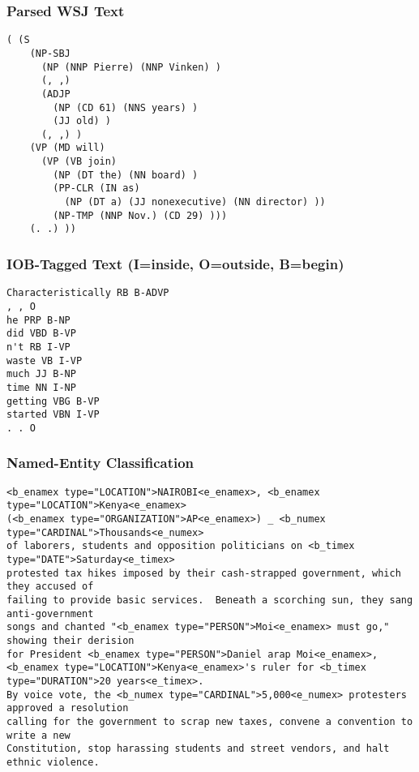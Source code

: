 \documentclass{beamer}             %
\begin{document}
\begin{frame}[fragile]
  \frametitle{Parsed WSJ Text}
{\scriptsize\begin{verbatim}
( (S
    (NP-SBJ
      (NP (NNP Pierre) (NNP Vinken) )
      (, ,)
      (ADJP
        (NP (CD 61) (NNS years) )
        (JJ old) )
      (, ,) )
    (VP (MD will)
      (VP (VB join)
        (NP (DT the) (NN board) )
        (PP-CLR (IN as)
          (NP (DT a) (JJ nonexecutive) (NN director) ))
        (NP-TMP (NNP Nov.) (CD 29) )))
    (. .) ))
\end{verbatim}}
\end{frame}

\begin{frame}[fragile]
  \frametitle{IOB-Tagged Text (I=inside, O=outside, B=begin)}
{\scriptsize\begin{verbatim}
Characteristically RB B-ADVP
, , O
he PRP B-NP
did VBD B-VP
n't RB I-VP
waste VB I-VP
much JJ B-NP
time NN I-NP
getting VBG B-VP
started VBN I-VP
. . O
\end{verbatim}}
\end{frame}

\begin{frame}[fragile]
  \frametitle{Named-Entity Classification}
{\tiny\begin{verbatim}
<b_enamex type="LOCATION">NAIROBI<e_enamex>, <b_enamex type="LOCATION">Kenya<e_enamex>
(<b_enamex type="ORGANIZATION">AP<e_enamex>) _ <b_numex type="CARDINAL">Thousands<e_numex>
of laborers, students and opposition politicians on <b_timex type="DATE">Saturday<e_timex>
protested tax hikes imposed by their cash-strapped government, which they accused of
failing to provide basic services.  Beneath a scorching sun, they sang anti-government
songs and chanted "<b_enamex type="PERSON">Moi<e_enamex> must go," showing their derision
for President <b_enamex type="PERSON">Daniel arap Moi<e_enamex>,
<b_enamex type="LOCATION">Kenya<e_enamex>'s ruler for <b_timex type="DURATION">20 years<e_timex>.
By voice vote, the <b_numex type="CARDINAL">5,000<e_numex> protesters approved a resolution
calling for the government to scrap new taxes, convene a convention to write a new
Constitution, stop harassing students and street vendors, and halt ethnic violence.
\end{verbatim}}
\end{frame}
\end{document}
